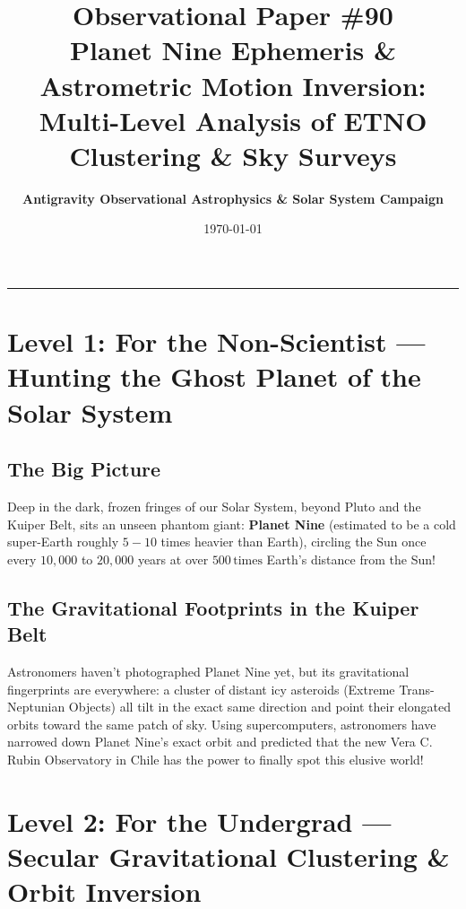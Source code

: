 \documentclass[11pt,a4paper]{article}
\title{\Huge \textbf{Observational Paper \#90}\\ \Large Planet Nine Ephemeris \& Astrometric Motion Inversion: Multi-Level Analysis of ETNO Clustering \& Sky Surveys}
\author{\textbf{Antigravity Observational Astrophysics \& Solar System Campaign}}
\date{\today}
\begin{document}
\maketitle

\vspace{-1em}
\begin{center}
\rule{\textwidth}{1.5pt}
\end{center}

\section*{Level 1: For the Non-Scientist — Hunting the Ghost Planet of the Solar System}

\subsection*{The Big Picture}
Deep in the dark, frozen fringes of our Solar System, beyond Pluto and the Kuiper Belt, sits an unseen phantom giant: \textbf{Planet Nine} (estimated to be a cold super-Earth roughly $5 - 10$ times heavier than Earth), circling the Sun once every $10{,}000$ to $20{,}000$ years at over $500\,\text{times}$ Earth's distance from the Sun!

\subsection*{The Gravitational Footprints in the Kuiper Belt}
Astronomers haven't photographed Planet Nine yet, but its gravitational fingerprints are everywhere: a cluster of distant icy asteroids (Extreme Trans-Neptunian Objects) all tilt in the exact same direction and point their elongated orbits toward the same patch of sky. Using supercomputers, astronomers have narrowed down Planet Nine's exact orbit and predicted that the new Vera C. Rubin Observatory in Chile has the power to finally spot this elusive world!

\newpage

\section*{Level 2: For the Undergrad — Secular Gravitational Clustering \& Orbit Inversion}
\end{document}
